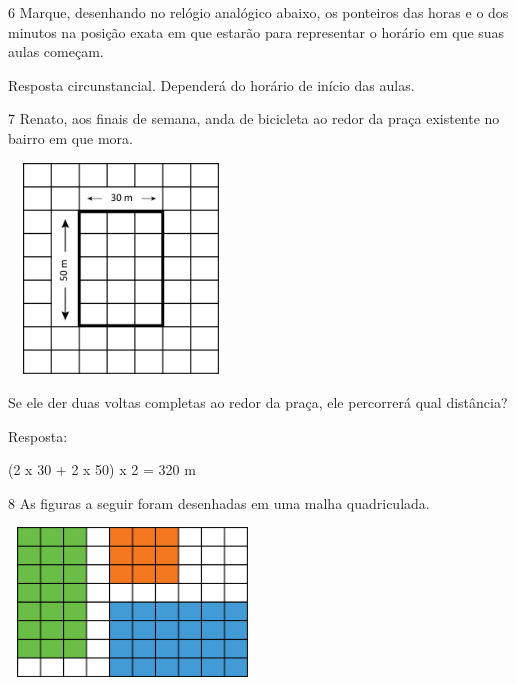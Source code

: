 \begin{escolha}
\num{6} Marque, desenhando no relógio analógico abaixo, os ponteiros das horas e o dos
minutos na posição exata em que estarão para representar o horário em que
suas aulas começam.



Resposta circunstancial. Dependerá do horário de início das aulas.


\num{7} Renato, aos finais de semana, anda de bicicleta ao redor da praça existente no bairro em que mora.


\includegraphics[width=2.35256in,height=2.20730in]{media/image55.png}

Se ele der duas voltas completas ao redor da praça, ele percorrerá qual distância?


Resposta:

(2 x 30 + 2 x 50) x 2 = 320 m


\num{8} As figuras a seguir foram desenhadas em uma malha quadriculada.


\includegraphics[width=2.59189in,height=1.55847in]{media/image56.png}


\end{escolha}
